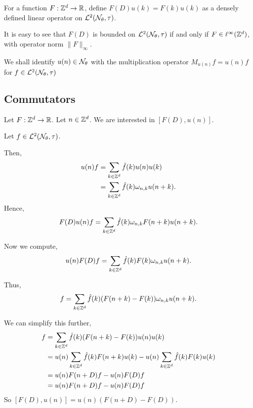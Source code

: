 For a function $F:\mathbb{Z}^d\rightarrow \mathbb{R}$, define $F(D) u(k) = F(k)u(k)$
as a densely defined linear operator on $\mathcal{L}^2(\mathcal{N}_\theta,\tau)$. 

It is easy to see that $F(D)$ is bounded on $\mathcal{L}^2(\mathcal{N}_\theta,\tau)$
if and only if $F \in \ell^\infty(\mathbb{Z}^d)$, with operator norm
$\|F\|_\infty$.

We shall identify $u(n) \in \mathcal{N}_\theta$ with the multiplication operator
$M_{u(n)}f = u(n)f$ for $f \in \mathcal{L}^2(\mathcal{N}_\theta,\tau)$

\subsection{Commutators}
\label{commutators}
Let $F:\mathbb{Z}^d\to\mathbb{R}$.
Let $n \in \mathbb{Z}^d$. We are interested in $[F(D),u(n)]$. 

Let $f \in \mathcal{L}^2(\mathcal{N}_\theta,\tau)$. 

Then,
\begin{align}
    u(n)f &= \sum_{k \in \mathbb{Z}^d} \hat{f}(k)u(n)u(k)\\
          &= \sum_{k \in \mathbb{Z}^d} \hat{f}(k)\omega_{n,k} u(n+k).
\end{align}
Hence,
\begin{equation}
    F(D) u(n)f = \sum_{k \in \mathbb{Z}^d} \hat{f}(k) \omega_{n,k} F(n+k) u(n+k).
\end{equation}

Now we compute,
\begin{equation}
    u(n)F(D)f = \sum_{k \in \mathbb{Z}^d} \hat{f}(k) F(k) \omega_{n,k} u(n+k).
\end{equation}

Thus,
\begin{equation}
    [F(D),u(n)]f = \sum_{k \in \Itgr^d} \hat{f}(k) (F(n+k)-F(k))\omega_{n,k}u(n+k).
\end{equation}

We can simplify this further,
\begin{align}
    [F(D),u(n)]f &= \sum_{k \in \Itgr^d} \hat{f}(k) (F(n+k)-F(k))u(n)u(k)\\
                 &= u(n)\sum_{k \in \Itgr^d}  \hat{f}(k) F(n+k)u(k) - u(n) \sum_{k \in \Itgr^d} \hat{f}(k)F(k)u(k)\\
                 &= u(n) F(n+D)f - u(n)F(D)f\\
                 \label{commutatorFormula}
                 &= u(n)F(n+D)f - u(n)F(D)f
\end{align}
So $[F(D),u(n)] = u(n)(F(n+D)-F(D))$. 

